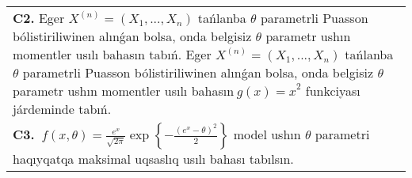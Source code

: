\documentclass{article}
\begin{document}
\begin{tabular}{m{17cm}}
 \\
\textbf{C2.} 
Eger \(X^{(n)} = \left( X_{1},...,X_{n} \right)\) tańlanba \(\theta\) parametrli Puasson bólistiriliwinen alınǵan bolsa, onda belgisiz \(\theta\) parametr ushın momentler usılı bahasın tabıń. Eger \(X^{(n)} = \left( X_{1},...,X_{n} \right)\) tańlanba \(\theta\) parametrli Puasson bólistiriliwinen alınǵan bolsa, onda belgisiz \(\theta\) parametr ushın momentler usılı bahasın\({\ g(x) = x}^{2}\) funkciyası járdeminde tabıń.
 \\
\textbf{C3.} 
\(\ f(x,\theta) = \frac{e^{x}}{\sqrt{2\pi}}\exp\left\{ - \frac{\left( e^{x} - \theta \right)^{2}}{2} \right\}\) model ushın \(\theta\) parametri haqıyqatqa maksimal uqsaslıq usılı bahası tabılsın.
 \\

\end{tabular}
\vspace{1cm}
\end{document}
